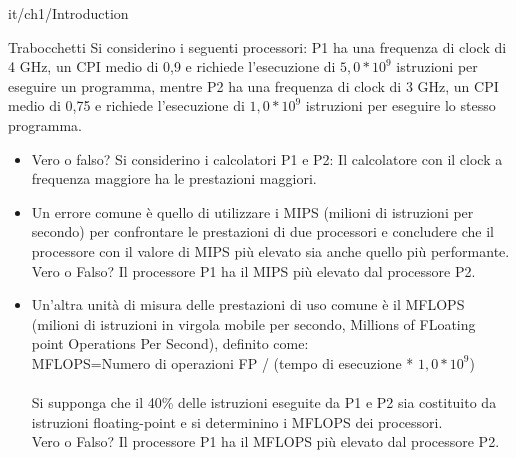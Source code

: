 \documentclass[11pt]{article}
\begin{document}
\begin{quiz}{it/ch1/Introduction}
\begin{cloze}[points=1,shuffle=true]{Trabocchetti}
Si considerino i seguenti processori: P1 ha una frequenza di clock di 4 GHz, un CPI medio di 0,9 e richiede l'esecuzione di $5,0*10^9$ istruzioni per eseguire un programma, mentre P2 ha una frequenza di clock di 3 GHz, un CPI medio di 0,75 e richiede l'esecuzione di $1,0*10^9$ istruzioni per eseguire lo stesso programma.
\begin{itemize}
    \item Vero o falso? Si considerino i calcolatori P1 e P2: Il calcolatore con il clock a frequenza maggiore ha le prestazioni maggiori.
    \item Un errore comune è quello di utilizzare i MIPS (milioni di istruzioni per secondo) per confrontare le prestazioni di due processori e concludere che il processore con il valore di MIPS più elevato sia anche quello più performante.\\
    Vero o Falso? Il processore P1 ha il MIPS più elevato dal processore P2.
    \item Un'altra unità di misura delle prestazioni di uso comune è il MFLOPS (milioni di istruzioni in virgola mobile per secondo, Millions of FLoating point Operations Per Second), definito come:\\
    MFLOPS=Numero di operazioni FP / (tempo di esecuzione * $1,0*10^9$)\\
    \\
    Si supponga che il 40\% delle istruzioni eseguite da P1 e P2 sia costituito da istruzioni floating-point e si determinino i MFLOPS dei processori.\\
    Vero o Falso? Il processore P1 ha il MFLOPS più elevato dal processore P2.
\end{itemize}
\end{cloze}


\end{quiz}
\end{document}
